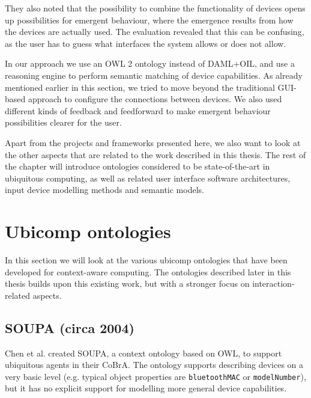 They also noted that the possibility to combine the functionality of devices opens up possibilities for emergent behaviour, where the emergence results from how the devices are actually used. The evaluation revealed that this can be confusing, as the user has to guess what interfaces the system allows or does not allow.

In our approach we use an \ac{OWL} 2 ontology instead of \ac{DAML}+\-\ac{OIL}, and use a reasoning engine to perform semantic matching of device capabilities. As already mentioned earlier in this section, we tried to move beyond the traditional \ac{GUI}-based approach to configure the connections between devices. We also used different kinds of feedback and feedforward to make emergent behaviour possibilities clearer for the user.

Apart from the projects and frameworks presented here, we also want to look at the other aspects that are related to the work described in this thesis. The rest of the chapter will introduce ontologies considered to be state-of-the-art in ubiquitous computing, as well as related user interface software architectures, input device modelling methods and semantic models.

\section{Ubicomp ontologies}
\label{UbicompOntologies}
In this section we will look at the various ubicomp ontologies that have been developed for context-aware computing. The ontologies described later in this thesis builds upon this existing work, but with a stronger focus on interaction-related aspects. 
 

\subsection{SOUPA (circa 2004)}

Chen et al. \cite{Chen2004} created \ac{SOUPA}, a context ontology based on \ac{OWL}, to support ubiquitous agents in their \ac{CoBrA}. The ontology supports describing devices on a very basic level (e.g. typical object properties are \texttt{bluetoothMAC} or \texttt{modelNumber}), but it has no explicit support for modelling more general device capabilities.


